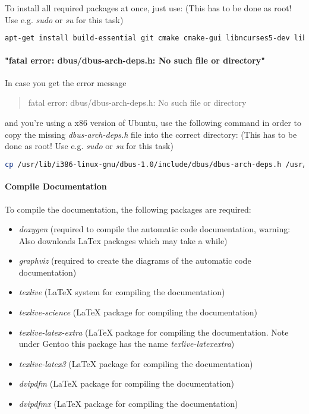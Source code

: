 To install all required packages at once, just use: (This has to be done as root! Use e.g. \emph{sudo} or \emph{su} for this task)
\begin{lstlisting}[language=sh]
apt-get install build-essential git cmake cmake-gui libncurses5-dev libxext-dev libxcursor-dev libdbus-1-dev libxxf86vm-dev libxrandr-dev libglu1-mesa-dev
\end{lstlisting}


\paragraph{"fatal error: dbus/dbus-arch-deps.h: No such file or directory"}
In case you get the error message \begin{quote}fatal error: dbus/dbus-arch-deps.h: No such file or directory\end{quote} and you're using a x86 version of Ubuntu, use the following command in order to copy the missing \emph{dbus-arch-deps.h} file into the correct directory: (This has to be done as root! Use e.g. \emph{sudo} or \emph{su} for this task)
\begin{lstlisting}[language=sh]
cp /usr/lib/i386-linux-gnu/dbus-1.0/include/dbus/dbus-arch-deps.h /usr/include/dbus-1.0/dbus
\end{lstlisting}


\paragraph{Compile Documentation}
To compile the documentation, the following packages are required:
\begin{itemize}
\item{\emph{doxygen} (required to compile the automatic code documentation, warning: Also downloads LaTex packages which may take a while)}
\item{\emph{graphviz} (required to create the diagrams of the automatic code documentation)}
\item{\emph{texlive} (\LaTeX{} system for compiling the documentation)}
\item{\emph{texlive-science} (\LaTeX{} package for compiling the documentation)}
\item{\emph{texlive-latex-extra} (\LaTeX{} package for compiling the documentation. Note under Gentoo this package has the name \emph{texlive-latexextra})}
\item{\emph{texlive-latex3} (\LaTeX{} package for compiling the documentation)}
\item{\emph{dvipdfm} (\LaTeX{} package for compiling the documentation)}
\item{\emph{dvipdfmx} (\LaTeX{} package for compiling the documentation)}
\end{itemize}

